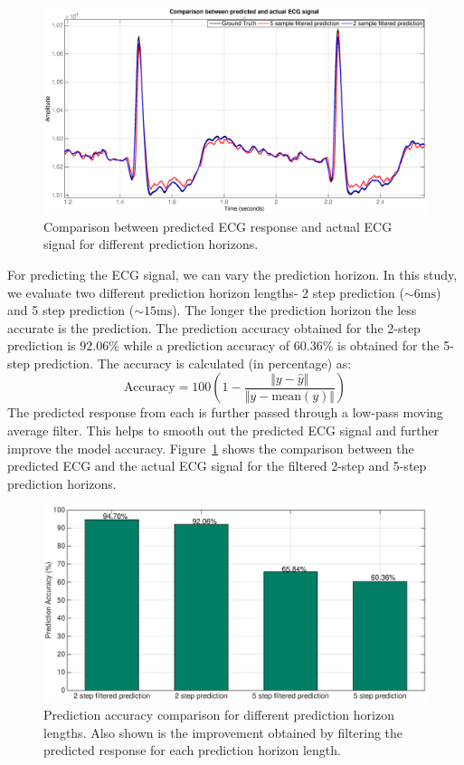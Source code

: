 \documentclass[letter, 10pt, journal]{elsarticle}
\theoremstyle{definition}
\begin{document}
\begin{figure}[!b]
\centering
\includegraphics[width=\textwidth]{comparison.eps}
\caption{Comparison between predicted ECG response and actual ECG signal for different prediction horizons.}
\label{fig:comparison}
\end{figure}

For predicting the ECG signal, we can vary the prediction horizon. In this study, we evaluate two different prediction horizon lengths- 2 step prediction ($\sim6\si{\milli\second}$) and 5 step prediction ($\sim15\si{\milli\second}$).
The longer the prediction horizon the less accurate is the prediction.
The prediction accuracy obtained for the 2-step prediction is $92.06\%$ while a prediction accuracy of $60.36\%$ is obtained for the 5-step prediction.
The accuracy is calculated  (in percentage) as:
\begin{equation}
\text{Accuracy} = 100 \left(1 - \frac{\Vert y - \hat{y} \Vert}{\Vert y - \text{mean}(y)\Vert} \right) 
\end{equation}
The predicted response from each is further passed through a low-pass moving average filter. This helps to smooth out the predicted ECG signal and further improve the model accuracy.
Figure~\ref{fig:comparison} shows the comparison between the predicted ECG and the actual ECG signal for the filtered 2-step and 5-step prediction horizons.

\begin{figure}
\centering
\includegraphics[width=\textwidth]{goodnessoffit.eps}
\caption{Prediction accuracy comparison for different prediction horizon lengths. Also shown is the improvement obtained by filtering the predicted response for each prediction horizon length.}
\label{fig:fit}
\end{figure}
\end{document}

